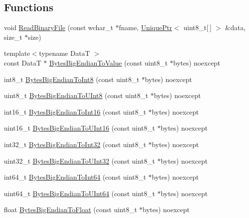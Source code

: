 \subsection*{Functions}
\begin{DoxyCompactItemize}
\item 
void \hyperlink{namespacemage_aef2e639196d406b6cfe71815d46b5cf9}{Read\+Binary\+File} (const wchar\+\_\+t $\ast$fname, \hyperlink{namespacemage_a8c307fbcc33bce9b7f2aa4c26c3b95cf}{Unique\+Ptr}$<$ uint8\+\_\+t\mbox{[}$\,$\mbox{]} $>$ \&data, size\+\_\+t $\ast$size)
\item 
{\footnotesize template$<$typename DataT $>$ }\\const DataT $\ast$ \hyperlink{namespacemage_ab15e14368ad3c9cbc6302a64fbf789bb}{Bytes\+Big\+Endian\+To\+Value} (const uint8\+\_\+t $\ast$bytes) noexcept
\item 
int8\+\_\+t \hyperlink{namespacemage_a725fa878aaf2bf3a8be1ce2ade51d22a}{Bytes\+Big\+Endian\+To\+Int8} (const uint8\+\_\+t $\ast$bytes) noexcept
\item 
uint8\+\_\+t \hyperlink{namespacemage_a372cbb208a8853b9ac186436b06912fc}{Bytes\+Big\+Endian\+To\+U\+Int8} (const uint8\+\_\+t $\ast$bytes) noexcept
\item 
int16\+\_\+t \hyperlink{namespacemage_adc57d989fb23987341f5a52546276d6d}{Bytes\+Big\+Endian\+To\+Int16} (const uint8\+\_\+t $\ast$bytes) noexcept
\item 
uint16\+\_\+t \hyperlink{namespacemage_ab99ec7df40eb1c2dbb8106fc03401f1d}{Bytes\+Big\+Endian\+To\+U\+Int16} (const uint8\+\_\+t $\ast$bytes) noexcept
\item 
int32\+\_\+t \hyperlink{namespacemage_a02236b9125c77b420301aff3aa83594e}{Bytes\+Big\+Endian\+To\+Int32} (const uint8\+\_\+t $\ast$bytes) noexcept
\item 
uint32\+\_\+t \hyperlink{namespacemage_ad7e69367e8054fba9854244270d955c9}{Bytes\+Big\+Endian\+To\+U\+Int32} (const uint8\+\_\+t $\ast$bytes) noexcept
\item 
int64\+\_\+t \hyperlink{namespacemage_acdf89224917da5c7f2f9ffe2bd8f8d25}{Bytes\+Big\+Endian\+To\+Int64} (const uint8\+\_\+t $\ast$bytes) noexcept
\item 
uint64\+\_\+t \hyperlink{namespacemage_a89df5661a1c0b04f6cacde99875cbd3c}{Bytes\+Big\+Endian\+To\+U\+Int64} (const uint8\+\_\+t $\ast$bytes) noexcept
\item 
float \hyperlink{namespacemage_acd50317aa85d2ceca5556f79219e7f4f}{Bytes\+Big\+Endian\+To\+Float} (const uint8\+\_\+t $\ast$bytes) noexcept
\item 

\end{DoxyCompactItemize}

